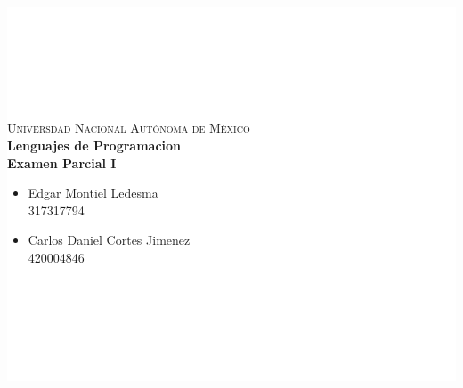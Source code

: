\documentclass{article}
\begin{document}
\pagecolor{white}
\color{black}

    \colorbox{white}{
        \begin{minipage}[t]{0.16 \textwidth}
           \begin{flushright}
            \includegraphics[width=1in]{UNAM.png}
           \end{flushright}
        \end{minipage}
        \begin{minipage}[H]{0.62 \textwidth}
            \begin{center}
                {\large \textsc{Universdad Nacional Autónoma de México}}
                \vspace{0.25cm}
                \\
                { \large \textbf{Lenguajes de Programacion\\ Examen Parcial I}}                
                \textbf{}
                \begin{multicols}{2}
                \begin{flushleft}
                \begin{itemize}
                    \item  \small Edgar Montiel Ledesma\\ 317317794
    
                    \item \footnotesize Carlos Daniel Cortes Jimenez\\ 420004846
                \end{itemize}
                \end{flushleft}
                \vspace{0.25cm}
                \end{multicols} 
            \end{center}
            \vspace{0.05cm}
        \end{minipage}
        \begin{minipage}[t]{0.16 \textwidth}
            \begin{flushleft}
                \includegraphics[width=1in]{EFC.png}
            \end{flushleft}
        \end{minipage}
    }
    
\end{document}

